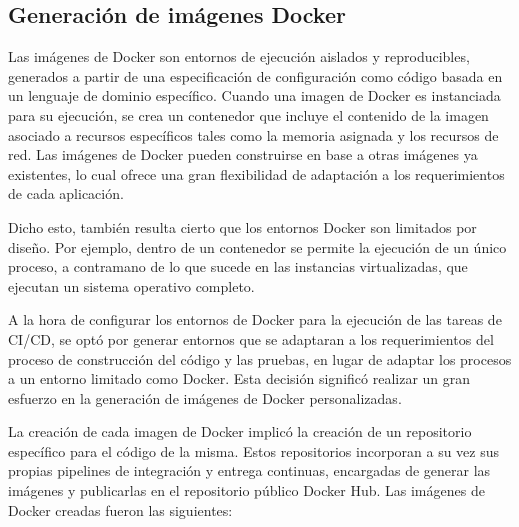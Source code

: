 \subsection{Generación de imágenes Docker}

Las imágenes de Docker son entornos de ejecución aislados y
reproducibles, generados a partir de una especificación de
configuración como código basada en un lenguaje de dominio
específico. Cuando una imagen de Docker es instanciada para su
ejecución, se crea un contenedor que incluye el contenido de la imagen
asociado a recursos específicos tales como la memoria asignada y los
recursos de red. Las imágenes de Docker pueden construirse en base a
otras imágenes ya existentes, lo cual ofrece una gran flexibilidad de
adaptación a los requerimientos de cada aplicación.

Dicho esto, también resulta cierto que los entornos Docker son
limitados por diseño. Por ejemplo, dentro de un contenedor se permite
la ejecución de un único proceso, a contramano de lo que sucede en las
instancias virtualizadas, que ejecutan un sistema operativo completo.

A la hora de configurar los entornos de Docker para la ejecución de
las tareas de CI/CD, se optó por generar entornos que se adaptaran a
los requerimientos del proceso de construcción del código y las
pruebas, en lugar de adaptar los procesos a un entorno limitado como
Docker. Esta decisión significó realizar un gran esfuerzo en la
generación de imágenes de Docker personalizadas.

La creación de cada imagen de Docker implicó la creación de un
repositorio específico para el código de la misma. Estos repositorios
incorporan a su vez sus propias pipelines de integración y entrega
continuas, encargadas de generar las imágenes y publicarlas en el
repositorio público Docker Hub. Las imágenes de Docker creadas fueron
las siguientes:


